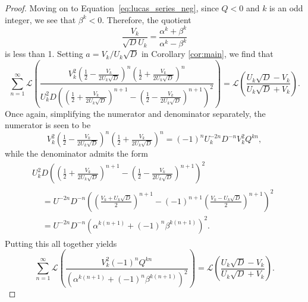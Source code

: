 \documentclass[10pt]{article}
\theoremstyle{definition}
\begin{document}
\begin{proof}
   Moving on to Equation~\eqref{eq:lucas_series_neg}, since $Q < 0$ and $k$ is an odd integer, we see that $\beta^k < 0$.  Therefore, the quotient
\begin{equation*}
    \frac{V_k}{\sqrt{D} U_k} = \frac{\alpha^k + \beta^k}{\alpha^k - \beta^k}
\end{equation*}
is less than 1.  Setting $a = V_k/U_k \sqrt{D}$ in Corollary \ref{cor:main}, we find that
    \begin{equation*}
        \sum_{n=1}^{\infty}\mathcal{L}\left(\frac{V^2_k\left(\frac{1}{2}-\frac{V_k}{2U_k\sqrt{D}}\right)^{n}\left(\frac{1}{2} + \frac{V_k}{2U_k\sqrt{D}}\right)^{n}}{U^2_k D\left(\left(\frac{1}{2}+\frac{V_k}{2U_k\sqrt{D}}\right)^{n+1}-\left(\frac{1}{2} - \frac{V_k}{2U_k\sqrt{D}}\right)^{n+1}\right)^2}\right) = \mathcal{L}\left(\frac{U_k\sqrt{D}-V_k}{U_k\sqrt{D}+V_k}\right).
    \end{equation*}
    Once again, simplifying the numerator and denominator separately, the numerator is seen to be
    \begin{equation*}
        V^2_k\left(\tfrac{1}{2}-\tfrac{V_k}{2U_k\sqrt{D}}\right)^{n}\left(\tfrac{1}{2} + \tfrac{V_k}{2U_k\sqrt{D}}\right)^{n} = (-1)^n U^{-2n}_k D^{-n} V^2_k Q^{kn},
    \end{equation*}
    while the denominator admits the form
    \begin{multline*}
     U^2_k D\left(\left(\tfrac{1}{2}+\tfrac{V_k}{2U_k\sqrt{D}}\right)^{n+1}-\left(\tfrac{1}{2} - \tfrac{V_k}{2U_k\sqrt{D}}\right)^{n+1}\right)^2 \quad\quad \quad\quad \quad\quad \quad\quad {}\\
     \begin{aligned}
        &= U^{-2n}D^{-n}\left(\left(\tfrac{V_k+U_k\sqrt{D}}{2}\right)^{n+1}-(-1)^{n+1}\left(\tfrac{V_k-U_k\sqrt{D}}{2} \right)^{n+1}\right)^2 \\
        &= U^{-2n} D^{-n} (\alpha^{k(n+1)} + (-1)^{n} \beta^{k(n+1)})^2.
     \end{aligned}
    \end{multline*}
    Putting this all together yields 
    \begin{equation*}
        \sum_{n=1}^{\infty}\mathcal{L}\left(\frac{V^2_k (-1)^n Q^{kn}}{\left(\alpha^{k(n+1)}+(-1)^{n}\beta^{k(n+1)}\right)^2 }\right) = \mathcal{L}\left(\frac{U_k\sqrt{D}-V_k}{U_k\sqrt{D}+V_k}\right).
    \end{equation*}
    

\end{proof}
\end{document}
